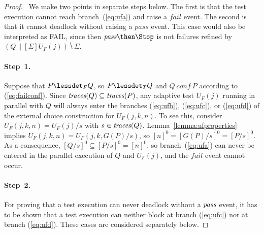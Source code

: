 \begin{proof}{~}We make two points in separate steps below. The
first is that the test execution cannot reach branch~(\ref{eq:ufa}) and raise
a $fail$ event.  The second is that it cannot deadlock without raising a
$pass$ event. This case would also be interpreted as FAIL, since then
$\epass\then\Stop$ is not failures refined by $(Q\parallel[\Sigma]
U_F(j))\hide \Sigma$.

\paragraph{Step~1.} Suppose that $P\lessdet_F Q$, so $P\lessdet_T Q$ and $Q\
conf\ P$ according to (\ref{eq:failconf}). Since   $\text{\it traces}(Q)\subseteq
\text{\it traces}(P)$, any adaptive test $U_F(j)$ running in parallel with $Q$ will always
enter the branches (\ref{eq:ufb}), (\ref{eq:ufc}), or (\ref{eq:ufd}) of the
external choice construction for $U_F(j,k,n)$. To see this, consider
 $U_F(j,k,n) = U_F(j)/s$
with $s\in\text{\it traces}(Q)$. Lemma~\ref{lemma:ufproperties} implies $U_F(j,k,n) =
U_F(j,k,G(P)/s)$, so $[n]^0 = [G(P)/s]^0 = [P/s]^0$. As a consequence,
$[Q/s]^0\subseteq [P/s]^0 = [n]^0$, so branch~(\ref{eq:ufa}) can never be
entered in the parallel execution of $Q$ and $U_F(j)$, and the $fail$ event
cannot occur.

\paragraph{Step~2.} For proving that a test execution can never deadlock without a
${\text{\it pass}}$ event, it has to be shown that a test execution can neither block at
branch (\ref{eq:ufc}) nor at branch (\ref{eq:ufd}). These cases are
considered separately below.


\end{proof}
